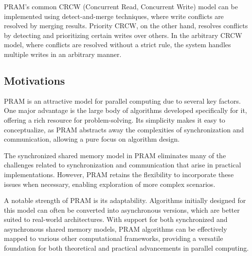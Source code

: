 PRAM's common CRCW (Concurrent Read, Concurrent Write) model can be implemented using detect-and-merge techniques, where write conflicts are resolved by merging results. 
Priority CRCW, on the other hand, resolves conflicts by detecting and prioritizing certain writes over others. 
In the arbitrary CRCW model, where conflicts are resolved without a strict rule, the system handles multiple writes in an arbitrary manner.

\subsection{Motivations}
PRAM is an attractive model for parallel computing due to several key factors. 
One major advantage is the large body of algorithms developed specifically for it, offering a rich resource for problem-solving. 
Its simplicity makes it easy to conceptualize, as PRAM abstracts away the complexities of synchronization and communication, allowing a pure focus on algorithm design.

The synchronized shared memory model in PRAM eliminates many of the challenges related to synchronization and communication that arise in practical implementations. 
However, PRAM retains the flexibility to incorporate these issues when necessary, enabling exploration of more complex scenarios.

A notable strength of PRAM is its adaptability. 
Algorithms initially designed for this model can often be converted into asynchronous versions, which are better suited to real-world architectures. 
With support for both synchronized and asynchronous shared memory models, PRAM algorithms can be effectively mapped to various other computational frameworks, providing a versatile foundation for both theoretical and practical advancements in parallel computing.